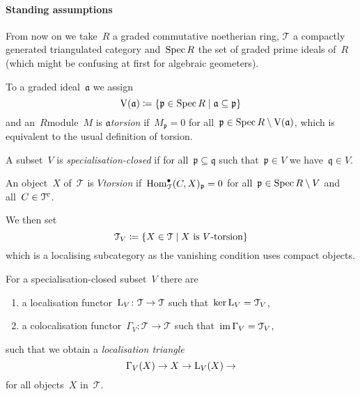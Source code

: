 \documentclass[10pt,a4paper]{article}
\begin{document}
\paragraph{Standing assumptions} From now on we take~$R$ a graded commutative noetherian ring, $\mathcal{T}$ a compactly generated triangulated category and~$\operatorname{Spec} R$ the set of graded prime ideals of~$R$ (which might be confusing at first for algebraic geometers).

To a graded ideal~$\mathfrak{a}$ we assign
\begin{equation}
  \operatorname{V}(\mathfrak{a})\coloneqq\left\{ \mathfrak{p}\in\operatorname{Spec} R\mid\mathfrak{a}\subseteq\mathfrak{p} \right\}
\end{equation}
and an~$R$\dash module~$M$ is \emph{$\mathfrak{a}$\dash torsion} if~$M_{\mathfrak{p}}=0$ for all~$\mathfrak{p}\in\operatorname{Spec} R\setminus\operatorname{V}(\mathfrak{a})$, which is equivalent to the usual definition of torsion.

A subset~$V$ is \emph{specialisation-closed} if for all~$\mathfrak{p}\subseteq\mathfrak{q}$ such that~$\mathfrak{p}\in V$ we have~$\mathfrak{q}\in V$.

\begin{definition}
  An object~$X$ of~$\mathcal{T}$ is \emph{$V$\dash torsion} if~$\operatorname{Hom}_{\mathcal{T}}^\bullet(C,X)_{\mathfrak{p}}=0$ for all~$\mathfrak{p}\in\operatorname{Spec} R\setminus V$ and all~$C\in\mathcal{T}^{\mathrm{c}}$.

  We then set
  \begin{equation}
    \mathcal{T}_V\coloneqq\left\{ X\in\mathcal{T}\mid\text{$X$ is $V$\dash torsion} \right\}
  \end{equation}
  which is a localising subcategory as the vanishing condition uses compact objects.
\end{definition}

\begin{proposition}
  For a specialisation-closed subset~$V$ there are
  \begin{enumerate}
    \item a localisation functor~$\operatorname{L}_V\colon\mathcal{T}\to\mathcal{T}$ such that~$\ker\operatorname{L}_V=\mathcal{T}_V$,
    \item a colocalisation functor~$\Gamma_V\colon\mathcal{T}\to\mathcal{T}$ such that~$\operatorname{im}\Gamma_V=\mathcal{T}_V$,
  \end{enumerate}
  such that we obtain a \emph{localisation triangle}
  \begin{equation}
    \Gamma_V(X)\to X\to\operatorname{L}_V(X)\to
  \end{equation}
  for all objects~$X$ in~$\mathcal{T}$.
\end{proposition}
\end{document}
